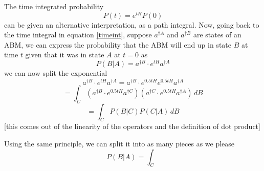 \documentclass[letterpaper,twocolumn,10pt]{article}
\begin{document}
The time integrated probability 
\begin{equation}
P(t) = e^{tH}P(0)
\label{timeint}
\end{equation}
can be given an alternative interpretation, as a path integral. 
Now, going back to the time integral in equation \ref{timeint}, suppose $a^{\dag A}$ and $a^{\dag B}$ are states of an ABM, we can express the probability that the ABM will end up in state $B$ at time $t$ given that it was in state $A$ at $t=0$ as
\[
P(B|A) = a^{\dag B}\cdot e^{tH} a^{\dag A}
\]
we can now split the exponential
\[
a^{\dag B}\cdot e^{tH} a^{\dag A} = a^{\dag B}\cdot e^{0.5tH} e^{0.5tH} a^{\dag A}
\]
\[
 = \int_C (a^{\dag B}\cdot e^{0.5tH}a^{\dag C}) (a^{\dag C} \cdot e^{0.5tH}a^{\dag A})\,dB
\]
\[
= \int_C P(B|C)P(C|A) \,dB
\]
[this comes out of the linearity of the operators and the definition of dot product]

Using the same principle, we can split it into as many pieces as we please
\[
P(B|A) = \int_C
\]
\end{document}
